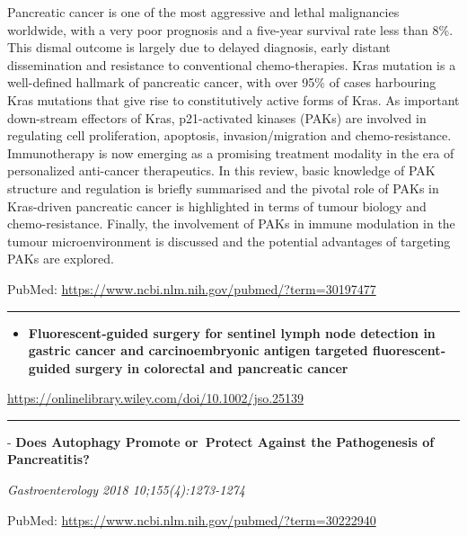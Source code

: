 \documentclass[]{article}
\providecommand{\tightlist}{%
  \setlength{\itemsep}{0pt}\setlength{\parskip}{0pt}}
\begin{document}
Pancreatic cancer is one of the most aggressive and lethal malignancies
worldwide, with a very poor prognosis and a five-year survival rate less
than 8\%. This dismal outcome is largely due to delayed diagnosis, early
distant dissemination and resistance to conventional chemo-therapies.
Kras mutation is a well-defined hallmark of pancreatic cancer, with over
95\% of cases harbouring Kras mutations that give rise to constitutively
active forms of Kras. As important down-stream effectors of Kras,
p21-activated kinases (PAKs) are involved in regulating cell
proliferation, apoptosis, invasion/migration and chemo-resistance.
Immunotherapy is now emerging as a promising treatment modality in the
era of personalized anti-cancer therapeutics. In this review, basic
knowledge of PAK structure and regulation is briefly summarised and the
pivotal role of PAKs in Kras-driven pancreatic cancer is highlighted in
terms of tumour biology and chemo-resistance. Finally, the involvement
of PAKs in immune modulation in the tumour microenvironment is discussed
and the potential advantages of targeting PAKs are explored.

PubMed: \url{https://www.ncbi.nlm.nih.gov/pubmed/?term=30197477}

{}

{}

\begin{center}\rule{0.5\linewidth}{\linethickness}\end{center}

\begin{itemize}
\tightlist
\item
  \textbf{Fluorescent‐guided surgery for sentinel lymph node detection
  in gastric cancer and carcinoembryonic antigen targeted
  fluorescent‐guided surgery in colorectal and pancreatic cancer}
\end{itemize}

\url{https://onlinelibrary.wiley.com/doi/10.1002/jso.25139}

\begin{center}\rule{0.5\linewidth}{\linethickness}\end{center}

 - \textbf{Does Autophagy Promote or~Protect Against the Pathogenesis of
Pancreatitis?}

\emph{Gastroenterology 2018 10;155(4):1273-1274}

PubMed: \url{https://www.ncbi.nlm.nih.gov/pubmed/?term=30222940}

{}

{}
\end{document}
